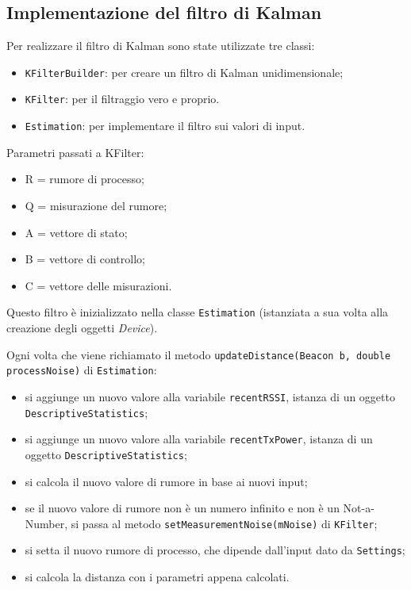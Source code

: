 \subsection{Implementazione del filtro di Kalman}

Per realizzare il filtro di Kalman sono state utilizzate tre classi: 
\begin{itemize}
	\item \texttt{KFilterBuilder}: per creare un filtro di Kalman unidimensionale;
	\item \texttt{KFilter}: per il filtraggio vero e proprio.
	\item \texttt{Estimation}: per implementare il filtro sui valori di input.
\end{itemize}
Parametri passati a KFilter:
\begin{itemize}
	\item R = rumore di processo;
	\item Q = misurazione del rumore;
	\item A = vettore di stato;
	\item B = vettore di controllo;
	\item C = vettore delle misurazioni.
\end{itemize}

Questo filtro è inizializzato nella classe \texttt{Estimation} (istanziata a sua volta alla creazione degli oggetti \textit{Device}).

Ogni volta che viene richiamato il metodo \texttt{updateDistance(Beacon b, double processNoise)} di \texttt{Estimation}:
\begin{itemize}
	\item si aggiunge un nuovo valore alla variabile \texttt{recentRSSI}, istanza di un oggetto \texttt{DescriptiveStatistics};
	\item si aggiunge un nuovo valore alla variabile \texttt{recentTxPower}, istanza di un oggetto \texttt{DescriptiveStatistics};
	\item si calcola il nuovo valore di rumore in base ai nuovi input;
	\item se il nuovo valore di rumore non è un numero infinito e non è un Not-a-Number, si passa al metodo \texttt{setMeasurementNoise(mNoise)} di \texttt{KFilter};
	\item si setta il nuovo rumore di processo, che dipende dall'input dato da \texttt{Settings};
	\item si calcola la distanza con i parametri appena calcolati.
\end{itemize}

